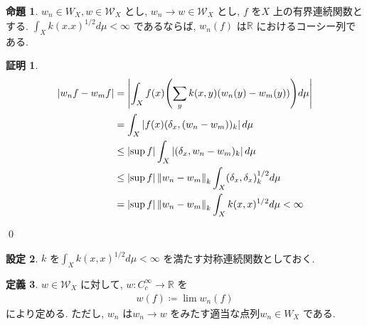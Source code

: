 \documentclass[10pt, fleqn, label-section=none]{bxjsarticle}
\theoremstyle{definition}
\newtheorem{dfn}{定義}[section]
\newtheorem{prop}[dfn]{命題}
\newtheorem{setting}[dfn]{設定}
\newtheorem*{pf*}{証明}
\newcommand{\paren}[1]{\mleft( #1\mright )}
\newcommand{\abs}[1]{\left|#1\right|}
\newcommand{\norm}[1]{\left\|#1\right\|}
\renewcommand{\;}{\, ; \,}
\begin{document}
\begin{prop} $w_n \in W_X, w \in \mathcal W_X$ とし, $w_n \rightarrow w \in \mathcal W_X$ とし, $f$ を$X$ 上の有界連続関数とする. $\int_{X} k(x.x)^{1/2} d\mu < \infty$ であるならば,  $w_n(f)$ は$\mathbb R$ におけるコーシー列である. 

\end{prop}
\begin{pf*}

\begin{align*} \abs{w_n f - w_m f}  & = \abs{ \int_X f(x) \paren{\sum_y k(x, y)(w_n(y) - w_m(y))} d\mu } \\& = \int_X \abs{f(x) (\delta_x, (w_n - w_m))_k} d\mu \\&\leq  \abs{\sup f} \int_X \abs{(\delta_x, w_n - w_m)_k } d\mu 
\\& \leq  \abs{\sup f} \norm{w_n - w_m}_k \int_X (\delta_x, \delta_x)_k ^{1/2} d\mu  \\&=  \abs{\sup f} \norm{w_n - w_m}_k \int_X k(x, x) ^{1/2} d\mu   < \infty  \end{align*}

\qed
\end{pf*}

\begin{setting}$k$ を$\int_X k(x,x)^{1/2} d \mu < \infty$ を満たす対称連続関数としておく. 

\end{setting}

\begin{dfn}$w \in \mathcal W_X$ に対して, $w: C_c^\infty \rightarrow \mathbb R$ を
\begin{align*} w(f) \coloneqq \lim w_n (f)  \end{align*}
により定める. ただし, $w_n $ は$w_n \rightarrow w$ をみたす適当な点列$w_n \in W_X $ である. 
\end{dfn}
\end{document}
